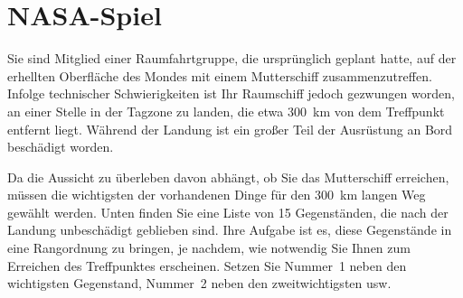 \chapter{NASA-Spiel}
\label{nasa-kopien}

Sie sind Mitglied einer Raumfahrtgruppe, die ursprünglich geplant hatte, auf der erhellten Oberfläche des Mondes mit einem Mutterschiff zusammenzutreffen. Infolge technischer Schwierigkeiten ist Ihr Raumschiff jedoch gezwungen worden, an einer Stelle in der Tagzone zu landen, die etwa 300~km von dem Treffpunkt entfernt liegt. Während der Landung ist ein großer Teil der Ausrüstung an Bord beschädigt worden.

Da die Aussicht zu überleben davon abhängt, ob Sie das Mutterschiff erreichen, müssen die wichtigsten der vorhandenen Dinge für den 300~km langen Weg gewählt werden. Unten finden Sie eine Liste von 15 Gegenständen, die nach der Landung unbeschädigt geblieben sind. Ihre Aufgabe ist es, diese Gegenstände in eine Rangordnung zu bringen, je nachdem, wie notwendig Sie Ihnen zum Erreichen des Treffpunktes erscheinen. Setzen Sie Nummer~1 neben den wichtigsten Gegenstand, Nummer~2 neben den zweitwichtigsten usw.


